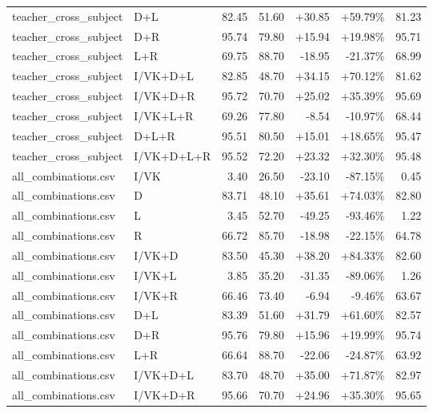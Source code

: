 \documentclass[UTF8,10pt,a4paper]{ctexart}
\newcommand{\better}[1]{\textcolor{ImpBlue}{#1}}
\newcommand{\worse}[1]{\textcolor{DropRed}{#1}}
\begin{document}
{\begin{longtable}{llrrrrr}
teacher\_cross\_subject & D+L & 82.45 & 51.60 & \better{+30.85} & \better{+59.79\%} & 81.23\\
teacher\_cross\_subject & D+R & 95.74 & 79.80 & \better{+15.94} & \better{+19.98\%} & 95.71\\
teacher\_cross\_subject & L+R & 69.75 & 88.70 & \worse{-18.95} & \worse{-21.37\%} & 68.99\\
teacher\_cross\_subject & I/VK+D+L & 82.85 & 48.70 & \better{+34.15} & \better{+70.12\%} & 81.62\\
teacher\_cross\_subject & I/VK+D+R & 95.72 & 70.70 & \better{+25.02} & \better{+35.39\%} & 95.69\\
teacher\_cross\_subject & I/VK+L+R & 69.26 & 77.80 & \worse{-8.54} & \worse{-10.97\%} & 68.44\\
teacher\_cross\_subject & D+L+R & 95.51 & 80.50 & \better{+15.01} & \better{+18.65\%} & 95.47\\
teacher\_cross\_subject & I/VK+D+L+R & 95.52 & 72.20 & \better{+23.32} & \better{+32.30\%} & 95.48\\
all\_combinations.csv & I/VK & 3.40 & 26.50 & \worse{-23.10} & \worse{-87.15\%} & 0.45\\
all\_combinations.csv & D & 83.71 & 48.10 & \better{+35.61} & \better{+74.03\%} & 82.80\\
all\_combinations.csv & L & 3.45 & 52.70 & \worse{-49.25} & \worse{-93.46\%} & 1.22\\
all\_combinations.csv & R & 66.72 & 85.70 & \worse{-18.98} & \worse{-22.15\%} & 64.78\\
all\_combinations.csv & I/VK+D & 83.50 & 45.30 & \better{+38.20} & \better{+84.33\%} & 82.60\\
all\_combinations.csv & I/VK+L & 3.85 & 35.20 & \worse{-31.35} & \worse{-89.06\%} & 1.26\\
all\_combinations.csv & I/VK+R & 66.46 & 73.40 & \worse{-6.94} & \worse{-9.46\%} & 63.67\\
all\_combinations.csv & D+L & 83.39 & 51.60 & \better{+31.79} & \better{+61.60\%} & 82.57\\
all\_combinations.csv & D+R & 95.76 & 79.80 & \better{+15.96} & \better{+19.99\%} & 95.74\\
all\_combinations.csv & L+R & 66.64 & 88.70 & \worse{-22.06} & \worse{-24.87\%} & 63.92\\
all\_combinations.csv & I/VK+D+L & 83.70 & 48.70 & \better{+35.00} & \better{+71.87\%} & 82.97\\
all\_combinations.csv & I/VK+D+R & 95.66 & 70.70 & \better{+24.96} & \better{+35.30\%} & 95.65\\

\end{longtable}}
\end{document}
